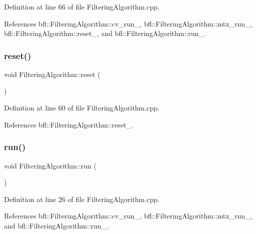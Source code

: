 Definition at line 66 of file Filtering\+Algorithm.\+cpp.



References bfl\+::\+Filtering\+Algorithm\+::cv\+\_\+run\+\_\+, bfl\+::\+Filtering\+Algorithm\+::mtx\+\_\+run\+\_\+, bfl\+::\+Filtering\+Algorithm\+::reset\+\_\+, and bfl\+::\+Filtering\+Algorithm\+::run\+\_\+.

\mbox{\label{classbfl_1_1FilteringAlgorithm_a2403c62fbd7bd7f5cda56a84f5f30331}} 
\subsubsection{\texorpdfstring{reset()}{reset()}}
{\footnotesize\ttfamily void Filtering\+Algorithm\+::reset (\begin{DoxyParamCaption}{ }\end{DoxyParamCaption})\hspace{0.3cm}{\ttfamily [inherited]}}



Definition at line 60 of file Filtering\+Algorithm.\+cpp.



References bfl\+::\+Filtering\+Algorithm\+::reset\+\_\+.

\mbox{\label{classbfl_1_1FilteringAlgorithm_a009cbe5f4bbb16967f6c6ddcaed8fbb1}} 
\subsubsection{\texorpdfstring{run()}{run()}}
{\footnotesize\ttfamily void Filtering\+Algorithm\+::run (\begin{DoxyParamCaption}{ }\end{DoxyParamCaption})\hspace{0.3cm}{\ttfamily [inherited]}}



Definition at line 26 of file Filtering\+Algorithm.\+cpp.



References bfl\+::\+Filtering\+Algorithm\+::cv\+\_\+run\+\_\+, bfl\+::\+Filtering\+Algorithm\+::mtx\+\_\+run\+\_\+, and bfl\+::\+Filtering\+Algorithm\+::run\+\_\+.

